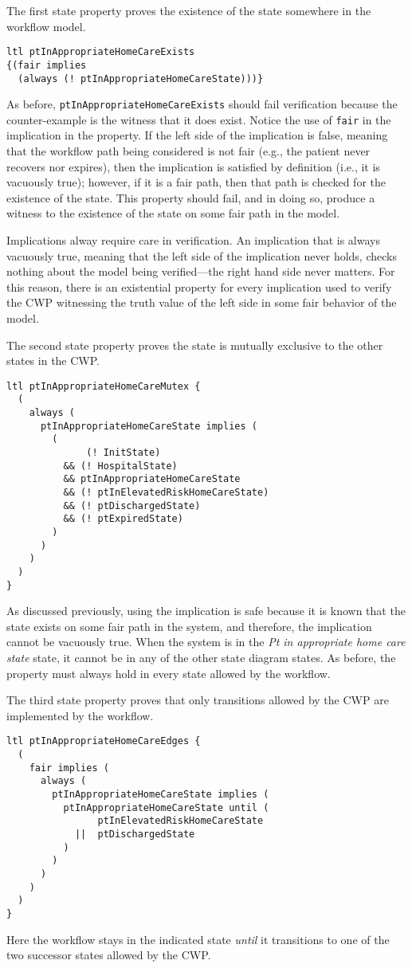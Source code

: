 The first state property proves the existence of the state somewhere in the workflow model.
%
{\small
\begin{lstlisting}[style=myPromela]
ltl ptInAppropriateHomeCareExists 
{(fair implies 
  (always (! ptInAppropriateHomeCareState)))}
\end{lstlisting}
}
%
\noindent As before, \texttt{ptInAppropriateHomeCareExists} should fail verification because the counter-example is the witness that it does exist. Notice the use of \texttt{fair} in the implication in the property. If the left side of the implication is false, meaning that the workflow path being considered is not fair (e.g., the patient never recovers nor expires), then the implication is satisfied by definition (i.e., it is vacuously true); however, if it is a fair path, then that path is checked for the existence of the state. This property should fail, and in doing so, produce a witness to the existence of the state on some fair path in the model.

Implications alway require care in verification. An implication that is always vacuously true, meaning that the left side of the implication never holds, checks nothing about the model being verified---the right hand side never matters. For this reason, there is an existential property for every implication used to verify the CWP witnessing the truth value of the left side in some fair behavior of the model.

The second state property proves the state is mutually exclusive to the other states in the CWP.
%
{\small
\begin{lstlisting}[style=myPromela]
ltl ptInAppropriateHomeCareMutex {
  ( 
    always (
      ptInAppropriateHomeCareState implies (
        (
              (! InitState)
          && (! HospitalState)
          && ptInAppropriateHomeCareState
          && (! ptInElevatedRiskHomeCareState)
          && (! ptDischargedState)
          && (! ptExpiredState)
        )
      )
    )
  )
}
\end{lstlisting}
}
%
\noindent As discussed previously, using the implication is safe because it is known that the state exists on some fair path in the system, and therefore, the implication cannot be vacuously true. When the system is in the \emph{Pt in appropriate home care state} state, it cannot be in any of the other state diagram states. As before, the property must always hold in every state allowed by the workflow.

The third state property proves that only transitions allowed by the CWP are implemented by the workflow.
%
{\small
\begin{lstlisting}[style=myPromela]
ltl ptInAppropriateHomeCareEdges {
  (
    fair implies (
      always (
        ptInAppropriateHomeCareState implies (
          ptInAppropriateHomeCareState until (
                ptInElevatedRiskHomeCareState
            ||  ptDischargedState
          )
        )
      )
    )
  )
}
\end{lstlisting}
}
%
\noindent Here the workflow stays in the indicated state \emph{until} it transitions to one of the two successor states allowed by the CWP. 

